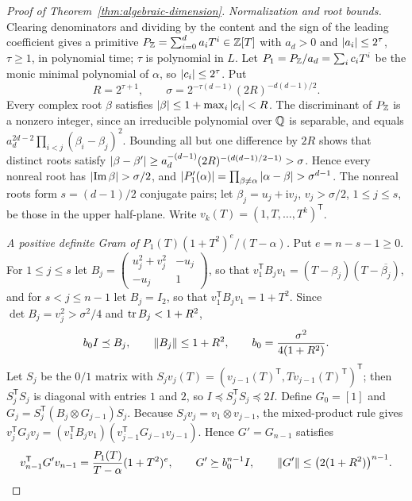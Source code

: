 \begin{proof}[Proof of Theorem~\ref{thm:algebraic-dimension}]
\emph{Normalization and root bounds.} Clearing denominators and dividing by
the content and the sign of the leading coefficient gives a primitive
$P_{\mathbb Z}=\sum_{i=0}^da_iT^i\in\mathbb Z[T]$ with $a_d>0$ and $\left\lvert a_i\right\rvert\le2^\tau$,
$\tau\ge1$, in polynomial time; $\tau$ is polynomial in $L$. Let
$P_1=P_{\mathbb Z}/a_d=\sum_ic_iT^i$ be the monic minimal polynomial of $\alpha$, so
$\left\lvert c_i\right\rvert\le2^\tau$. Put
\[
 R=2^{\tau+1},\qquad \sigma=2^{-\tau(d-1)}(2R)^{-d(d-1)/2}.
\]
Every complex root $\beta$ satisfies $\left\lvert\beta\right\rvert\le1+\max_i\left\lvert c_i\right\rvert<R$. The
discriminant of $P_{\mathbb Z}$ is a nonzero integer, since an irreducible polynomial
over $\mathbb Q$ is separable, and equals $a_d^{2d-2}\prod_{i<j}(\beta_i-\beta_j)^2$.
Bounding all but one difference by $2R$ shows that distinct roots satisfy
$\left\lvert\beta-\beta'\right\rvert\ge a_d^{-(d-1)}(2R)^{-(d(d-1)/2-1)}>\sigma$. Hence every
nonreal root has $\left\lvert\operatorname{Im}\beta\right\rvert>\sigma/2$, and
$\left\lvert P_1'(\alpha)\right\rvert=\prod_{\beta\ne\alpha}\left\lvert\alpha-\beta\right\rvert>\sigma^{d-1}$.
The nonreal roots form $s=(d-1)/2$ conjugate pairs; let
$\beta_j=u_j+\mathrm iv_j$, $v_j>\sigma/2$, $1\le j\le s$, be those in the
upper half-plane. Write $v_k(T)=(1,T,\ldots,T^k)^{\mathsf T}$.

\emph{A positive definite Gram of $P_1(T)(1+T^2)^e/(T-\alpha)$.} Put
$e=n-s-1\ge0$. For $1\le j\le s$ let
$B_j=\left(\begin{smallmatrix}u_j^2+v_j^2&-u_j\\-u_j&1\end{smallmatrix}\right)$,
so that $v_1^{\mathsf T}B_jv_1=(T-\beta_j)(T-\overline{\beta_j})$, and for
$s<j\le n-1$ let $B_j=I_2$, so that $v_1^{\mathsf T}B_jv_1=1+T^2$. Since
$\det B_j=v_j^2>\sigma^2/4$ and $\operatorname{tr} B_j<1+R^2$,
\[
 b_0I\preceq B_j,\qquad \left\lVert B_j\right\rVert\le1+R^2,\qquad
 b_0=\frac{\sigma^2}{4(1+R^2)} .
\]
Let $S_j$ be the $0/1$ matrix with
$S_jv_j(T)=(v_{j-1}(T)^{\mathsf T},Tv_{j-1}(T)^{\mathsf T})^{\mathsf T}$; then
$S_j^{\mathsf T}S_j$ is diagonal with entries $1$ and $2$, so
$I\preceq S_j^{\mathsf T}S_j\preceq2I$. Define $G_0=[1]$ and
$G_j=S_j^{\mathsf T}(B_j\otimes G_{j-1})S_j$. Because
$S_jv_j=v_1\otimes v_{j-1}$, the mixed-product rule gives
$v_j^{\mathsf T}G_jv_j=(v_1^{\mathsf T}B_jv_1)(v_{j-1}^{\mathsf
T}G_{j-1}v_{j-1})$. Hence $G'=G_{n-1}$ satisfies
\[
 v_{n-1}^{\mathsf T}G'v_{n-1}=\frac{P_1(T)}{T-\alpha}(1+T^2)^e,\qquad
 G'\succeq b_0^{n-1}I,\qquad \left\lVert G'\right\rVert\le\bigl(2(1+R^2)\bigr)^{n-1}.
\]


\end{proof}
